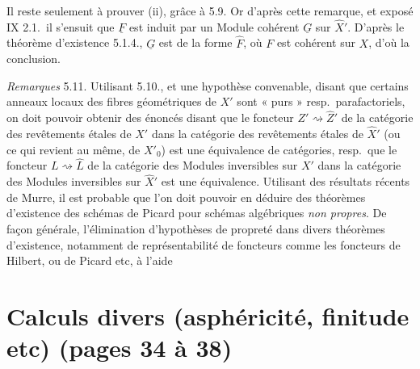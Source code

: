 \documentclass[11pt,a4paper]{article}
\begin{document}
Il reste seulement à prouver (ii), grâce à 5.9. Or d'après cette remarque,
et exposé IX 2.1.\ il s'ensuit que $\underline{F}$ est induit par un Module
cohérent $\underline{G}$ sur $\widehat{X}'$. D'après le théorème
 d'existence  5.1.4., $\underline{G}$
est de la forme $\widehat{F}$, où $F$ est cohérent sur $X$, d'où la
conclusion.

\emph{Remarques} 5.11.  Utilisant 5.10.,  et
 une hypothèse convenable, disant que
certains anneaux locaux des fibres géométriques de $X'$ 
sont « purs » resp.\ parafactoriels, on doit pouvoir obtenir des énoncés
disant \struck{\ill{}} que le foncteur $Z' \rightsquigarrow \widehat{Z}'$
de la catégorie des revêtements étales de $X'$ dans la catégorie des
revêtements étales de $\widehat{X}'$ \struck{\ill{}} (ou ce qui revient au
même, de $X'_0$) est  une équivalence de
catégories, resp.\ que le foncteur $L \rightsquigarrow \widehat{L}$ de la
catégorie des Modules inversibles sur $X'$ dans la catégorie des Modules
inversibles sur $\widehat{X}'$ est une équivalence. Utilisant des résultats
récents de Murre, il est probable que l'on doit pouvoir en déduire
des théorèmes d'existence  des schémas de Picard pour
 schémas algébriques \struck{\ill{}} \emph{non propres}.
\struck{\ill{}} De façon générale, l'élimination d'hypothèses de propreté
dans divers théorèmes d'existence, notamment de représentabilité de
foncteurs comme les foncteurs de Hilbert, ou de Picard etc, à l'aide

\section*{Calculs divers (asphéricité, finitude etc) (pages 34 à 38)}

\end{document}
